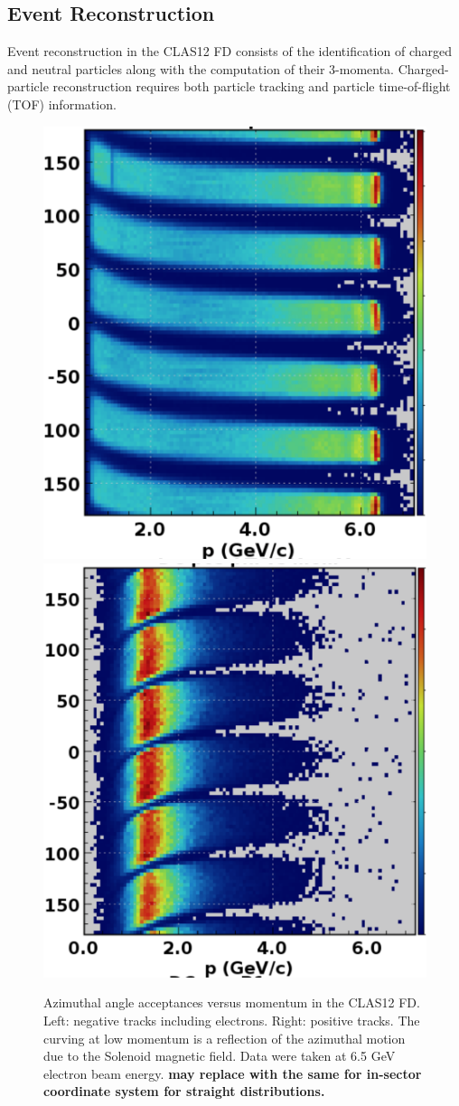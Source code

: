 \documentclass[final,3p,times,twocolumn,authoryear]{elsarticle}
\begin{document}
\subsection{\rm Event Reconstruction} 
Event reconstruction in the CLAS12 FD consists of the identification of charged and neutral particles along with the 
computation of their 3-momenta. Charged-particle reconstruction requires both particle tracking and particle 
time-of-flight (TOF) information. 
\begin{figure}[htbp!]
\centerline {
\includegraphics[width=0.5\columnwidth]{neg-tracks.png}
\includegraphics[width=0.52\columnwidth]{pos-tracks.png}}
\caption{Azimuthal angle acceptances versus momentum in the CLAS12 FD. Left: negative tracks including electrons. Right: positive tracks. The curving at low momentum is a reflection of the azimuthal motion due to the Solenoid magnetic field. Data were taken at 6.5 GeV electron beam energy. {\bf may replace with the same for in-sector coordinate system for straight distributions. } } 
\label{neg-pos}
\end{figure}
\end{document}
